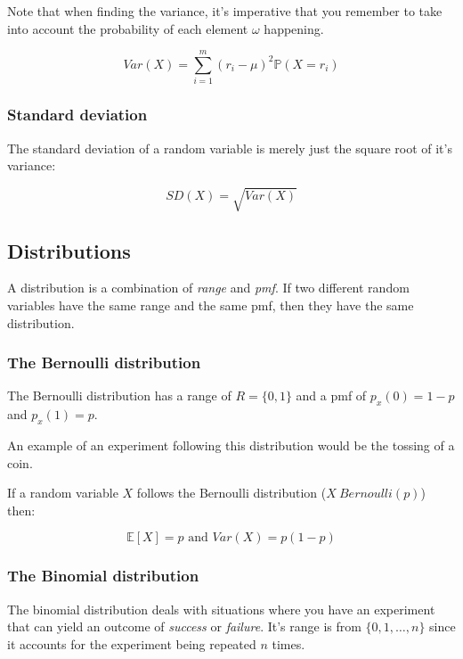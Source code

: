 Note that when finding the variance, it's imperative that you remember to take
into account the probability of each element $\omega$ happening.

\begin{dmath*}
	{Var(X) = \sum\limits_{i=1}^{m}(r_i - \mu)^2\mathbb{P}(X=r_i)}
\end{dmath*}

\subsubsection{Standard deviation}

The standard deviation of a random variable is merely just the square root of
it's variance:

\begin{dmath*}
	SD(X) = \sqrt{Var(X)}
\end{dmath*}

\subsection{Distributions}

A distribution is a combination of {\it range} and {\it pmf}. If two different
random variables have the same range and the same pmf, then they have the same
distribution.

\subsubsection{The Bernoulli distribution}

The Bernoulli distribution has a range of $R = \{0, 1\}$ and a pmf of $p_x(0) =
1-p$ and $p_x(1) = p$.

An example of an experiment following this distribution would be the tossing of
a coin.

If a random variable $X$ follows the Bernoulli distribution ($X ~ Bernoulli(p)$)
then:

\begin{dmath*}
	{\mathbb{E}[X] = p} \textrm{ and } {Var(X) = p(1-p)}
\end{dmath*}

\subsubsection{The Binomial distribution}

The binomial distribution deals with situations where you have an experiment
that can yield an outcome of {\it success} or {\it failure}. It's range is from
$\{0, 1, \dots, n\}$ since it accounts for the experiment being repeated $n$
times.

